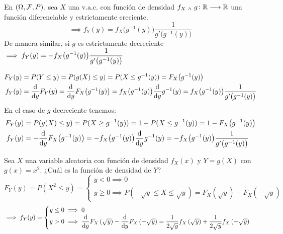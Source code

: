 \begin{teo}
	En $(\Omega, \mathcal{F}, P)$, sea $X$ una v.a.c. con función de densidad $f_X \; _{\wedge} \; g \colon \mathbb{R} \longrightarrow \mathbb{R}$ una función diferenciable y estrictamente creciente.
	\[\implies f_Y(y)=f_X\big(g^{-1}(y)\big) \frac{1}{g'\big(g^{-1}(y)\big)}\]
	De manera similar, si $g$ es estrictamente decreciente$\displaystyle\implies f_Y(y)= - f_X\big(g^{-1}(y)\big) \frac{1}{g'\big(g^{-1}(y)\big)}$
	\begin{dem}
		\[\begin{aligned}
				F_Y(y) & = P(Y\leq y) = P(g(X)\leq y) = P(X\leq g^{-1}(y)) = F_X\big(g^{-1}(y)\big)                                                                                  \\
				f_Y(y) & = \odv{}{y} F_Y(y) = \odv{}{y} F_X\big(g^{-1}(y)\big) = f_X\big(g^{-1}(y)\big) \odv{}{y} g^{-1}(y) = f_X\big(g^{-1}(y)\big) \frac{1}{g'\big(g^{-1}(y)\big)}
			\end{aligned}\]
		En el caso de $g$ decreciente tenemos:
		\[\begin{aligned}
				F_Y(y) & = P(g(X)\leq y) = P(X\geq g^{-1}(y)) = 1 - P(X\leq g^{-1}(y)) = 1 - F_X\big(g^{-1}(y)\big)                                                  \\
				f_Y(y) & = -\odv{}{y} F_X\big(g^{-1}(y)\big) = -f_X\big(g^{-1}(y)\big) \odv{}{y} g^{-1}(y) = -f_X\big(g^{-1}(y)\big) \frac{1}{g'\big(g^{-1}(y)\big)}
			\end{aligned}\]
	\end{dem}
\end{teo}

\begin{ejer}
	Sea $X$ una variable aleatoria con función de densidad $f_X(x)$ y $Y=g(X)$ con $g(x)=x^2$. ¿Cuál es la función de densidad de $Y$?
	\[F_Y(y) = P(X^2\leq y)=\begin{cases}
			y<0 \implies 0 \\
			y\geq 0 \implies P\left(-\sqrt{y}\leq X\leq \sqrt{y}\right) = F_X\left(\sqrt{y}\right)-F_X\left(-\sqrt{y}\right)
		\end{cases}\]
	\[\implies f_Y(y)=\begin{cases}
			y \leq 0 \implies 0 \\
			y > 0 \implies \ds \odv{}{y} F_X\left(\sqrt{y}\right)-\odv{}{y} F_X\left(-\sqrt{y}\right) = \frac{1}{2\sqrt{y}} f_X\left(\sqrt{y}\right) + \frac{1}{2\sqrt{y}} f_X\left(-\sqrt{y}\right)
		\end{cases}\]
\end{ejer}

